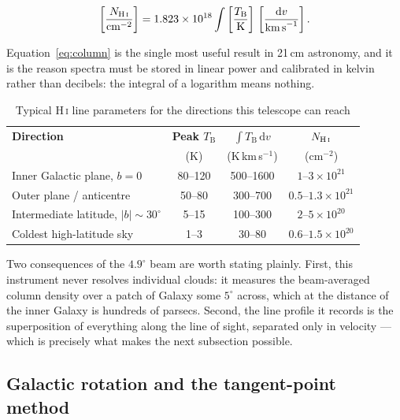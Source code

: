 \documentclass[11pt,a4paper]{article}
\begin{document}
\begin{equation}
\left[\frac{N_{\text{H\,\textsc{i}}}}{\text{cm}^{-2}}\right] = 1.823\times10^{18}
\int \left[\frac{T_\text{B}}{\text{K}}\right]\,
\left[\frac{\mathrm{d}v}{\text{km\,s}^{-1}}\right].
\label{eq:column}
\end{equation}

Equation~\eqref{eq:column} \cite{wilsonrohlfs} is the single most useful result in 21\,cm astronomy, and it is the reason spectra must be stored in linear power and calibrated in kelvin rather than decibels: the integral of a logarithm means nothing.

\begin{table}[H]
\centering
\caption{Typical H\,\textsc{i} line parameters for the directions this telescope can reach}
\label{tab:hivalues}
\small
\begin{tabular}{lccc}
\toprule
\textbf{Direction} & \textbf{Peak $T_\text{B}$} & \textbf{$\int T_\text{B}\,\mathrm{d}v$} & \textbf{$N_{\text{H\,\textsc{i}}}$} \\
 & (K) & (K\,km\,s$^{-1}$) & (cm$^{-2}$) \\
\midrule
Inner Galactic plane, $b=0$ & 80--120 & 500--1600 & $1$--$3\times10^{21}$ \\
Outer plane / anticentre & 50--80 & 300--700 & $0.5$--$1.3\times10^{21}$ \\
Intermediate latitude, $|b| \sim 30^\circ$ & 5--15 & 100--300 & $2$--$5\times10^{20}$ \\
Coldest high-latitude sky & 1--3 & 30--80 & $0.6$--$1.5\times10^{20}$ \\
\bottomrule
\end{tabular}
\end{table}

Two consequences of the $4.9^\circ$ beam are worth stating plainly. First, this instrument never resolves individual clouds: it measures the beam-averaged column density over a patch of Galaxy some $5^\circ$ across, which at the distance of the inner Galaxy is hundreds of parsecs. Second, the line profile it records is the superposition of everything along the line of sight, separated only in velocity --- which is precisely what makes the next subsection possible.

\subsection{Galactic rotation and the tangent-point method}
\end{document}
